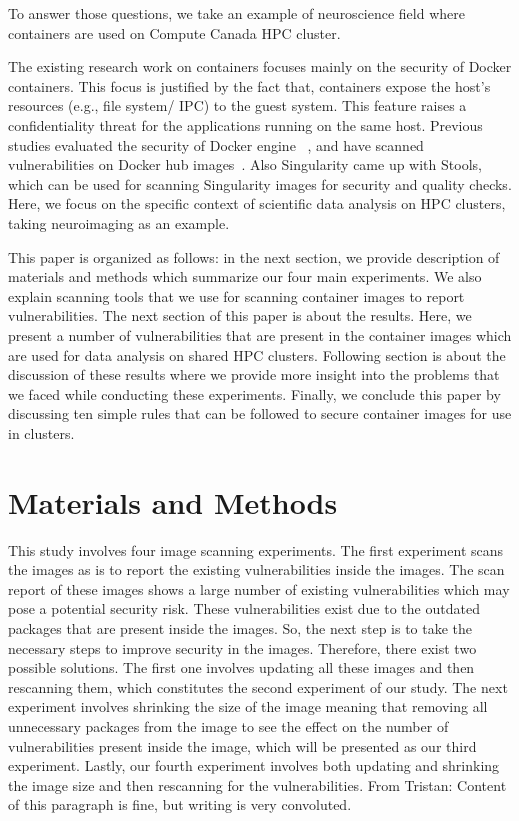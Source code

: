 \documentclass[a4paper,num-refs]{oup-contemporary}
\newcommand{\tristan}[1]{\color{blue}From Tristan: #1\color{black}}
\begin{document}
To answer those questions, we take an example of neuroscience field where
containers are used on Compute Canada HPC cluster.

The existing research work on containers focuses mainly on the security of Docker
containers.
This focus is justified by the fact that, containers expose the host's resources
(e.g., file system/ IPC) to the guest system. This feature raises a confidentiality
threat for the applications running on the same host. Previous studies evaluated
the security of Docker engine ~\cite{martin2018docker, sultan2019container, combe2016docker, bui2015analysis},
and have scanned vulnerabilities on Docker hub images~\cite{Shu2017, gummaraju2015over}.
Also Singularity came up with Stools, which can be used for scanning Singularity images
for security and quality checks.
Here, we focus on the specific context of scientific data analysis on HPC clusters, taking
neuroimaging as an example.


This paper is organized as follows: in the next section, we provide description
of materials and methods which summarize our four main experiments. We also explain
scanning tools that we use for scanning container images to report
vulnerabilities. The next section of this paper is about the results. Here, we
present a number of vulnerabilities that are present in the container images
which are used for data analysis on shared HPC clusters. Following section is about 
the discussion of these results where we provide more insight into the problems that 
we faced while conducting these experiments. Finally, we conclude this paper by discussing ten simple
rules that can be followed to secure container images for use in clusters.

\section{Materials and Methods}

This study involves four image scanning experiments.
The first experiment scans the images as is to report the existing vulnerabilities
inside the images. The scan report of
these images shows a large number of existing vulnerabilities which may pose
a potential security risk. These vulnerabilities exist due to the outdated
packages that are present inside the images. So, the next step is to
take the necessary steps to improve security in the images. Therefore, there exist
two possible solutions.
The first one involves updating
all these images and then rescanning them, which constitutes the second experiment of our study. The next 
experiment involves shrinking the size of the image
meaning that removing all unnecessary packages from the image to see the effect on the number of
vulnerabilities present inside the image, which will be presented as our third experiment.
Lastly, our fourth experiment involves both updating and shrinking the image size and then
rescanning for the vulnerabilities. \tristan{Content of this paragraph is fine, but writing is very convoluted.}
\end{document}
